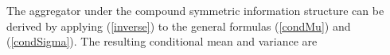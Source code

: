 \documentclass[11pt,twoside]{article}
\theoremstyle{definition}
\theoremstyle{definition}
\begin{document}
The aggregator under the compound symmetric information structure can be derived by applying (\ref{inverse}) to the general formulas (\ref{condMu}) and (\ref{condSigma}). The resulting conditional mean and variance are 
%
\end{document}
